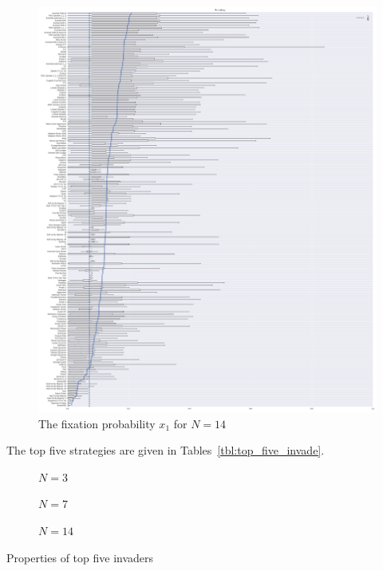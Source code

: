 \documentclass{article}
\begin{document}
\begin{figure}[!hbtp]
    \centering
    \includegraphics[height=.8\textheight]{./img/boxplot_14_invade.pdf}
    \caption{The fixation probability \(x_1\) for \(N=14\)}
    \label{fig:boxplot_14_invade}
\end{figure}


The top five strategies are given in Tables~\ref{tbl:top_five_invade}.

\begin{table}[!hbtp]
    \begin{subfigure}[t]{\textwidth}
        \centering
        
        \caption{\(N=3\)}
    \end{subfigure}
    \begin{subfigure}[t]{\textwidth}
        \centering
        
        \caption{\(N=7\)}
    \end{subfigure}
    \begin{subfigure}[t]{\textwidth}
        \centering
        
        \caption{\(N=14\)}
    \end{subfigure}
    \caption{Properties of top five invaders}
    \label{tbl:top_five_invade}
\end{table}
\end{document}
